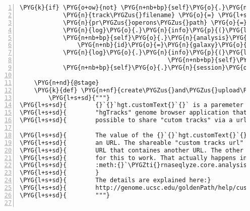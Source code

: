 \begin{Verbatim}[commandchars=\\\{\},numbers=left,firstnumber=1,stepnumber=5]
        \PYG{k}{if} \PYG{o+ow}{not} \PYG{n+nb+bp}{self}\PYG{o}{.}\PYG{n}{analysis}\PYG{o}{.}\PYG{n}{galaxy\PYGZus{}pr\PYGZus{}operons}\PYG{p}{:}
            \PYG{n}{track\PYGZus{}filename} \PYG{o}{=} \PYG{l+s}{"}\PYG{l+s}{rna-seqlyze-operon\PYGZus{}predictions.bigbed}\PYG{l+s}{"}
            \PYG{n}{pr\PYGZus{}operons\PYGZus{}path} \PYG{o}{=} \PYG{n}{join}\PYG{p}{(}\PYG{n+nb+bp}{self}\PYG{o}{.}\PYG{n}{analysis}\PYG{o}{.}\PYG{n}{data\PYGZus{}dir}\PYG{p}{,} \PYG{n}{track\PYGZus{}filename}\PYG{p}{)}
            \PYG{n}{log}\PYG{o}{.}\PYG{n}{info}\PYG{p}{(}\PYG{l+s}{"}\PYG{l+s}{uploading }\PYG{l+s+si}{\PYGZpc{}s}\PYG{l+s}{ to galaxy}\PYG{l+s}{"} \PYG{o}{\PYGZpc{}} \PYG{n}{track\PYGZus{}filename}\PYG{p}{)}
            \PYG{n+nb+bp}{self}\PYG{o}{.}\PYG{n}{analysis}\PYG{o}{.}\PYG{n}{galaxy\PYGZus{}pr\PYGZus{}operons} \PYG{o}{=} \PYG{n}{GalaxyDataset}\PYG{p}{(}
                \PYG{n+nb}{id}\PYG{o}{=}\PYG{n}{galaxy}\PYG{o}{.}\PYG{n}{upload}\PYG{p}{(}\PYG{n+nb}{open}\PYG{p}{(}\PYG{n}{pr\PYGZus{}operons\PYGZus{}path}\PYG{p}{)}\PYG{p}{,} \PYG{n+nb+bp}{self}\PYG{o}{.}\PYG{n}{pr\PYGZus{}operons\PYGZus{}name}\PYG{p}{)}\PYG{p}{)}
            \PYG{n}{log}\PYG{o}{.}\PYG{n}{info}\PYG{p}{(}\PYG{l+s}{"}\PYG{l+s}{...done - id: }\PYG{l+s+si}{\PYGZpc{}s}\PYG{l+s}{"} \PYG{o}{\PYGZpc{}}
                                         \PYG{n+nb+bp}{self}\PYG{o}{.}\PYG{n}{analysis}\PYG{o}{.}\PYG{n}{galaxy\PYGZus{}pr\PYGZus{}operons}\PYG{o}{.}\PYG{n}{id}\PYG{p}{)}
            \PYG{n+nb+bp}{self}\PYG{o}{.}\PYG{n}{session}\PYG{o}{.}\PYG{n}{commit}\PYG{p}{(}\PYG{p}{)}

    \PYG{n+nd}{@stage}
    \PYG{k}{def} \PYG{n+nf}{create\PYGZus{}and\PYGZus{}upload\PYGZus{}hg\PYGZus{}text}\PYG{p}{(}\PYG{n+nb+bp}{self}\PYG{p}{)}\PYG{p}{:}
        \PYG{l+s+sd}{"""}
\PYG{l+s+sd}{        {}`{}`hgt.customText{}`{}` is a paremeter of the UCSC}
\PYG{l+s+sd}{        "hgTracks" genome browser application that makes it}
\PYG{l+s+sd}{        possible to share "cutom tracks" via a url.}

\PYG{l+s+sd}{        The value of the {}`{}`hgt.customText{}`{}` parameter is itself}
\PYG{l+s+sd}{        an URL. The shareable "custom tracks url" is therefore an}
\PYG{l+s+sd}{        URL that containes another URL. The other url must be "escaped"}
\PYG{l+s+sd}{        for this to work. That actually happens in}
\PYG{l+s+sd}{        :meth:{}`\PYGZti{}rnaseqlyze.core.analysis.AnalysisMixins.hg\PYGZus{}url{}`.}
\PYG{l+s+sd}{        }
\PYG{l+s+sd}{        The details are explained here:}
\PYG{l+s+sd}{        http://genome.ucsc.edu/goldenPath/help/customTrack.html\PYGZsh{}SHARE}
\PYG{l+s+sd}{        """}


\end{Verbatim}

